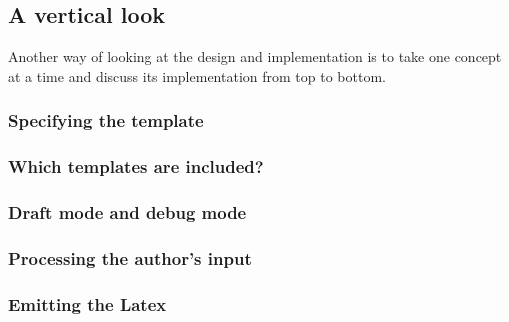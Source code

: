 \documentclass[11pt]{article}
\begin{document}
\subsection{A vertical look}

Another way of looking at the design and implementation is to take one concept at a time and discuss its implementation from top to bottom.


\subsubsection{Specifying the template}


\subsubsection{Which templates are included?}


\subsubsection{Draft mode and debug mode}


\subsubsection{Processing the author's input}


\subsubsection{Emitting the Latex}

\pagebreak
\end{document}
